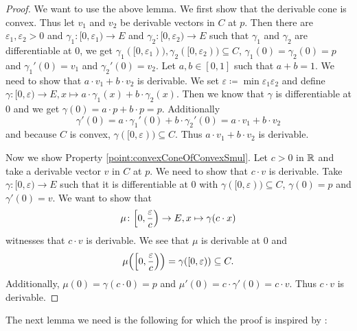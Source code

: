 \begin{proof}
We want to use the above lemma. 
We first show that the derivable cone is convex. 
Thus let $v_1$ and $v_2$ be derivable vectors in $C$ at $p$.
Then there are $\varepsilon_1, \varepsilon_2 > 0$ and $\gamma_1 \colon [0, \varepsilon_1) \to E$ and $\gamma_2 \colon [0, \varepsilon_2) \to E$ such that $\gamma_1$ and $\gamma_2$ are differentiable at $0$, we get $\gamma_1([0, \varepsilon_1)), \gamma_2([0, \varepsilon_2)) \subseteq C$, $\gamma_1(0) = \gamma_2(0) = p$ and $\gamma_1'(0)=v_1$ and $\gamma_2'(0) = v_2$.
Let $a, b \in [0, 1]$ such that $a + b = 1$. 
We need to show that $a \cdot v_1 + b \cdot v_2$ is derivable. 
We set $\varepsilon \coloneq \min \varepsilon_1 \varepsilon_2$ and define $\gamma \colon [0, \varepsilon) \to E, x \mapsto a \cdot \gamma_1(x) + b \cdot \gamma_2(x)$.  
Then we know that $\gamma$ is differentiable at $0$ and we get $\gamma (0) = a \cdot p + b \cdot p = p$. Additionally 
\begin{equation*}
\gamma'(0) = a \cdot \gamma_1'(0) + b \cdot \gamma_2'(0) = a \cdot v_1 + b \cdot v_2
\end{equation*}
and because $C$ is convex, $\gamma([0, \varepsilon)) \subseteq C$. 
Thus $a \cdot v_1 + b \cdot v_2$ is derivable. 

Now we show Property \ref{point:convexConeOfConvexSmul}.
Let $c > 0$ in $\mathbb{R}$ and take a derivable vector $v$ in $C$ at $p$. 
We need to show that $c \cdot v$ is derivable. 
Take $\gamma \colon [0, \varepsilon) \to E$ such that it is differentiable at $0$ with $\gamma ([0, \varepsilon)) \subseteq C$, $\gamma (0) = p$ and $\gamma'(0) = v$. 
We want to show that
\begin{equation*}
\mu \colon \Bigl[0, \frac{\varepsilon}{c}\Bigr) \to E, x \mapsto \gamma (c \cdot x)
\end{equation*}
witnesses that $c \cdot v$ is derivable. 
We see that $\mu$ is derivable at $0$ and 
\begin{equation*}
\mu\Bigl(\Bigl[0, \frac{\varepsilon}{c}\Bigr)\Bigr) = \gamma ([0, \varepsilon)) \subseteq C.
\end{equation*}
Additionally, $\mu (0) = \gamma (c \cdot 0) = p$ and $\mu'(0) = c \cdot \gamma' (0) = c \cdot v$. 
Thus $c \cdot v$ is derivable. 
\end{proof}

The next lemma we need is the following for which the proof is inspired by \cite{Rios2018}: 


